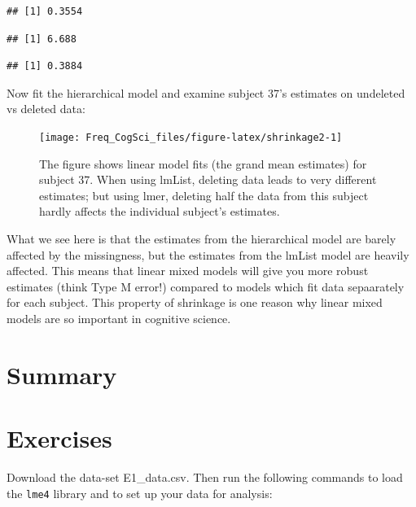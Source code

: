 \documentclass[12pt,]{krantz}
\newenvironment{Shaded}{\begin{snugshade}}{\end{snugshade}}
\newcommand{\CommentTok}[1]{\textcolor[rgb]{0.56,0.35,0.01}{\textit{#1}}}
\newcommand{\DataTypeTok}[1]{\textcolor[rgb]{0.13,0.29,0.53}{#1}}
\newcommand{\DecValTok}[1]{\textcolor[rgb]{0.00,0.00,0.81}{#1}}
\newcommand{\KeywordTok}[1]{\textcolor[rgb]{0.13,0.29,0.53}{\textbf{#1}}}
\newcommand{\NormalTok}[1]{#1}
\newcommand{\OperatorTok}[1]{\textcolor[rgb]{0.81,0.36,0.00}{\textbf{#1}}}
\newcommand{\OtherTok}[1]{\textcolor[rgb]{0.56,0.35,0.01}{#1}}
\newcommand{\StringTok}[1]{\textcolor[rgb]{0.31,0.60,0.02}{#1}}
\begin{document}
\begin{verbatim}
## [1] 0.3554
\end{verbatim}

\begin{verbatim}
## [1] 6.688
\end{verbatim}

\begin{verbatim}
## [1] 0.3884
\end{verbatim}

Now fit the hierarchical model and examine subject 37's estimates on undeleted vs deleted data:

\begin{figure}
\texttt{[image: Freq\_CogSci\_files/figure-latex/shrinkage2-1]} \caption{The figure shows linear model fits (the grand mean estimates) for subject 37. When using lmList, deleting data leads to very different estimates; but using lmer, deleting half the data from this subject hardly affects the individual subject's estimates.}\label{fig:shrinkage2}
\end{figure}

What we see here is that the estimates from the hierarchical model are barely affected by the missingness, but the estimates from the lmList model are heavily affected.
This means that linear mixed models will give you more robust estimates (think Type M error!) compared to models which fit data sepaarately for each subject. This property of shrinkage is one reason why linear mixed models are so important in cognitive science.

\hypertarget{summary}{%
\section{Summary}\label{summary}}

\hypertarget{sec:LMExercises}{%
\section{Exercises}\label{sec:LMExercises}}

Download the data-set E1\_data.csv. Then run the following commands to load the \texttt{lme4} library and to set up your data for analysis:

\begin{Shaded}
\end{Shaded}
\end{document}

